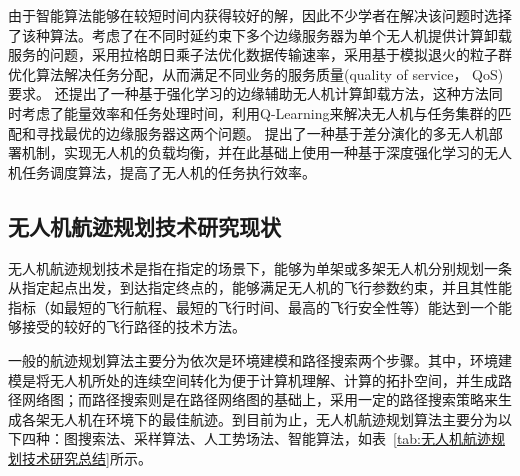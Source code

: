 由于智能算法能够在较短时间内获得较好的解，因此不少学者在解决该问题时选择了该种算法。\citet{zhu2018CooperativeComputationOffloadinga}考虑了在不同时延约束下多个边缘服务器为单个无人机提供计算卸载服务的问题，采用拉格朗日乘子法优化数据传输速率，采用基于模拟退火的粒子群优化算法解决任务分配，从而满足不同业务的服务质量(quality of service， QoS)要求。
\citet{kim2020MachineLearningBaseda}还提出了一种基于强化学习的边缘辅助无人机计算卸载方法，这种方法同时考虑了能量效率和任务处理时间，利用Q-Learning来解决无人机与任务集群的匹配和寻找最优的边缘服务器这两个问题。
\citet{yang2020MultiUAVEnabledLoadBalanceMobileEdge}提出了一种基于差分演化的多无人机部署机制，实现无人机的负载均衡，并在此基础上使用一种基于深度强化学习的无人机任务调度算法，提高了无人机的任务执行效率。

\subsection{无人机航迹规划技术研究现状}

无人机航迹规划技术是指在指定的场景下，能够为单架或多架无人机分别规划一条从指定起点出发，到达指定终点的，能够满足无人机的飞行参数约束，并且其性能指标（如最短的飞行航程、最短的飞行时间、最高的飞行安全性等）能达到一个能够接受的较好的飞行路径的技术方法\citep{bortoff2000PathPlanningUAVsa}。

一般的航迹规划算法主要分为依次是环境建模和路径搜索两个步骤。其中，环境建模是将无人机所处的连续空间转化为便于计算机理解、计算的拓扑空间，并生成路径网络图；而路径搜索则是在路径网络图的基础上，采用一定的路径搜索策略来生成各架无人机在环境下的最佳航迹。到目前为止，无人机航迹规划算法主要分为以下四种：图搜索法、采样算法、人工势场法、智能算法，如表~\ref{tab:无人机航迹规划技术研究总结}所示。

